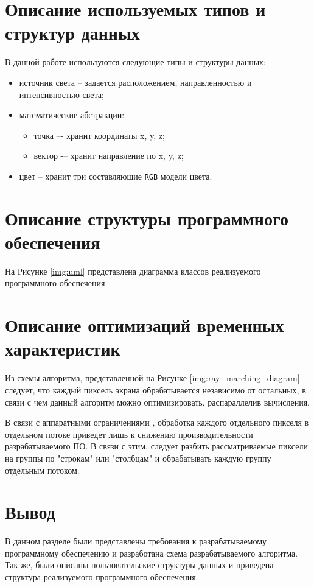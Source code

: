 \section{Описание используемых типов и структур данных}

В данной работе используются следующие типы и структуры данных:

\begin{itemize}
    \item источник света -- задается расположением, направленностью и интенсивностью света;
    \item математические абстракции:
    \begin{itemize}
        \item точка –- хранит координаты x, y, z;
        \item вектор -– хранит направление по x, y, z;
    \end{itemize}
	\item цвет -- хранит три составляющие \texttt{RGB} модели цвета.
\end{itemize}

\section{Описание структуры программного обеспечения}

На Рисунке \ref{img:uml} представлена диаграмма классов реализуемого программного обеспечения.



\section {Описание оптимизаций временных характеристик}

Из схемы алгоритма, представленной на Рисунке \ref{img:ray_marching_diagram} следует, что каждый пиксель экрана обрабатывается независимо от остальных, в связи с чем данный алгоритм можно оптимизировать, распараллелив вычисления.

В связи с аппаратными ограничениями \cite{amdal}, обработка каждого отдельного пикселя в отдельном потоке приведет лишь к снижению производительности разрабатываемого ПО. В связи с этим, следует разбить рассматриваемые пиксели на группы по "строкам" или "столбцам" и обрабатывать каждую группу отдельным потоком.

\section{Вывод}

В данном разделе были представлены требования к разрабатываемому программному обеспечению и разработана схема разрабатываемого алгоритма. Так же, были описаны пользовательские структуры данных и приведена структура реализуемого программного обеспечения.